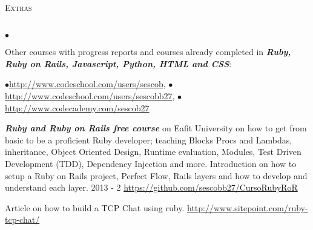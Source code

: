 \documentclass[a4paper]{article}
\newcommand{\lineunder}{\vspace*{-8pt} \\ \hspace*{-18pt} \hrulefill \\}
\newcommand{\header}[1]{{\hspace*{-15pt}\vspace*{6pt}
    \textsc{#1}} \vspace*{-6pt} \lineunder}
\newenvironment{achievements}{\begin{list}{$\bullet$}{\topsep 0pt \itemsep
      -2pt}}{\vspace*{4pt}\end{list}}
\newcommand{\emphasys}[1]{\textbf{\emph{#1}}}
\begin{document}
\header{Extras}
\begin{achievements}
\item{Other courses with progress reports and courses already completed in \emphasys{Ruby, Ruby on Rails, Javascript, Python, HTML and CSS}:}\\
\begin{center}
$\bullet$\url{http://www.codeschool.com/users/sescob},
$\bullet$\url{http://www.codeschool.com/users/sescobb27},
$\bullet$\url{http://www.codecademy.com/sescob27}
\end{center}
\item{\emphasys{Ruby and Ruby on Rails free course} on Eafit University on how to get from basic to be a proficient Ruby developer; teaching Blocks Procs and Lambdas, inheritance, Object Oriented Design, Runtime evaluation, Modules, Test Driven Development (TDD), Dependency Injection and more. Introduction on how to setup a Ruby on Rails project, Perfect Flow, Rails layers and how to develop and understand each layer. 2013 - 2 \url{https://github.com/sescobb27/CursoRubyRoR}}
\item{Article on how to build a TCP Chat using ruby. \url{http://www.sitepoint.com/ruby-tcp-chat/}}
\end{achievements}
\end{document}
